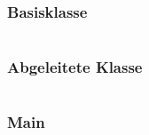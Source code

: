 \documentclass[12pt]{scrartcl}
\begin{document}
\subsubsection{Basisklasse}
\inputminted{java}{java/src/main/java/javademo/Baseclass.java}
\subsubsection{Abgeleitete Klasse}
\inputminted{java}{java/src/main/java/javademo/Derivedclass.java}
\subsubsection{Main}
\inputminted{java}{java/src/main/java/javademo/Demo.java}
\pagebreak

\end{document}

